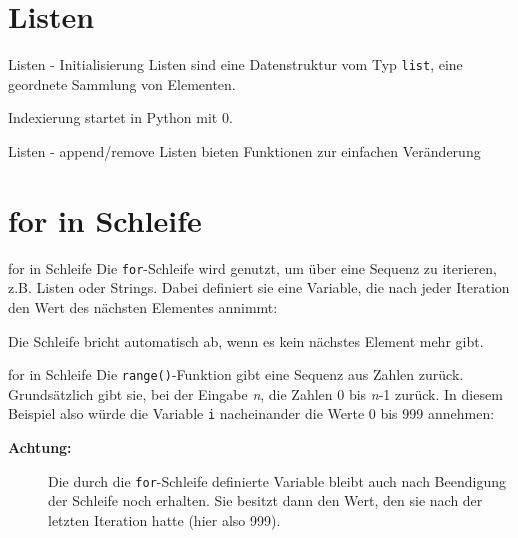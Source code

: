 \section{Listen}
\begin{frame}{Listen - Initialisierung}
	Listen sind eine Datenstruktur vom Typ \alert{\texttt{list}}, eine geordnete Sammlung von Elementen.
	
	Indexierung startet in Python mit 0.
	
\end{frame}
\begin{frame}{Listen - append/remove}
	Listen bieten Funktionen zur einfachen Veränderung
	
	
	
	
\end{frame}

\section{for in Schleife}
\begin{frame}{for in Schleife}
	Die \alert{\texttt{for}}-Schleife wird genutzt, um über eine Sequenz zu iterieren, z.B. Listen oder Strings. Dabei definiert sie eine Variable, die nach jeder Iteration den Wert des nächsten Elementes annimmt:
	
	
	Die Schleife bricht automatisch ab, wenn es kein nächstes Element mehr gibt.
\end{frame}

\begin{frame}{for in Schleife}
	Die \alert{\texttt{range()}}-Funktion gibt eine Sequenz aus Zahlen zurück. Grundsätzlich gibt sie, bei der Eingabe \textit{n}, die Zahlen 0 bis \textit{n}-1 zurück. In diesem Beispiel also würde die Variable \alert{\texttt{i}} nacheinander die Werte 0 bis 999 annehmen:
	
	\begin{description}
		\item[\textbf{Achtung:}] Die durch die \alert{\texttt{for}}-Schleife definierte Variable bleibt auch nach Beendigung der Schleife noch erhalten. Sie besitzt dann den Wert, den sie nach der letzten Iteration hatte (hier also 999).
	\end{description}
\end{frame}

